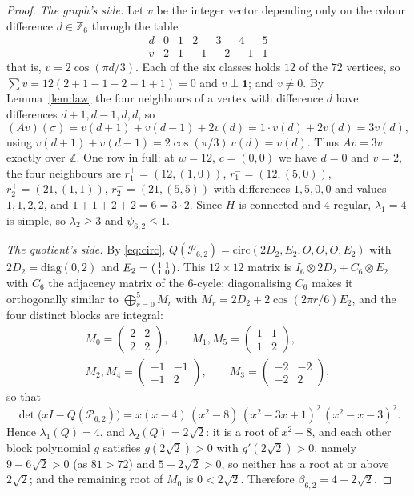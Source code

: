 \documentclass[11pt]{amsart}
\theoremstyle{remark}
\newcommand{\PP}{\mathcal P}
\newcommand{\lam}{\lambda}
\begin{document}
\begin{proof}
\emph{The graph's side.} Let $v$ be the integer vector depending only on the colour
difference $d\in\mathbb Z_6$ through the table
\begin{equation}\label{eq:vec}
 \begin{array}{c|cccccc}
  d&0&1&2&3&4&5\\\hline
  v&2&1&-1&-2&-1&1
 \end{array}
\end{equation}
that is, $v=2\cos(\pi d/3)$. Each of the six classes holds $12$ of the $72$ vertices, so
$\sum v=12(2+1-1-2-1+1)=0$ and $v\perp\mathbf 1$; and $v\ne0$. By Lemma~\ref{lem:law} the
four neighbours of a vertex with difference $d$ have differences $d+1,d-1,d,d$, so
\[
 (Av)(\sigma)=v(d+1)+v(d-1)+2v(d)=1\cdot v(d)+2v(d)=3v(d),
\]
using $v(d+1)+v(d-1)=2\cos(\pi/3)\,v(d)=v(d)$. Thus $Av=3v$ exactly over $\mathbb Z$. One row
in full: at $w=12$, $c=(0,0)$ we have $d=0$ and $v=2$, the four neighbours are
$r_1^{+}=(12,(1,0))$, $r_1^{-}=(12,(5,0))$, $r_2^{+}=(21,(1,1))$, $r_2^{-}=(21,(5,5))$ with
differences $1,5,0,0$ and values $1,1,2,2$, and $1+1+2+2=6=3\cdot2$. Since $H$ is connected
and $4$-regular, $\lam_1=4$ is simple, so $\lam_2\ge3$ and $\psi_{6,2}\le1$.

\emph{The quotient's side.} By \eqref{eq:circ},
$Q(\PP_{6,2})=\mathrm{circ}(2D_2,E_2,O,O,O,E_2)$ with $2D_2=\mathrm{diag}(0,2)$ and
$E_2=\begin{psmallmatrix}1&1\\1&0\end{psmallmatrix}$. This $12\times12$ matrix is
$I_6\otimes2D_2+C_6\otimes E_2$ with $C_6$ the adjacency matrix of the $6$-cycle;
diagonalising $C_6$ makes it orthogonally similar to $\bigoplus_{r=0}^{5}M_r$ with
$M_r=2D_2+2\cos(2\pi r/6)E_2$, and the four distinct blocks are integral:
\[
 \begin{gathered}
 M_0=\begin{pmatrix}2&2\\2&2\end{pmatrix},\qquad
 M_{1},M_5=\begin{pmatrix}1&1\\1&2\end{pmatrix},\\[4pt]
 M_{2},M_4=\begin{pmatrix}-1&-1\\-1&2\end{pmatrix},\qquad
 M_3=\begin{pmatrix}-2&-2\\-2&2\end{pmatrix},
 \end{gathered}
\]
so that
\[
 \det\bigl(xI-Q(\PP_{6,2})\bigr)
 =x(x-4)\,(x^2-8)\,(x^2-3x+1)^2\,(x^2-x-3)^2 .
\]
Hence $\lam_1(Q)=4$, and $\lam_2(Q)=2\sqrt2$: it is a root of $x^2-8$, and each other block
polynomial $g$ satisfies $g(2\sqrt2)>0$ with $g'(2\sqrt2)>0$, namely
$9-6\sqrt2>0$ (as $81>72$) and $5-2\sqrt2>0$, so neither has a root at or above
$2\sqrt2$; and the remaining root of $M_0$ is $0<2\sqrt2$. Therefore $\beta_{6,2}=4-2\sqrt2$.


\end{proof}
\end{document}
